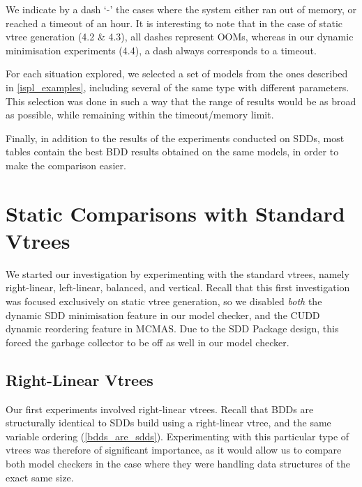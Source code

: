 \documentclass[11pt]{report}
\begin{document}
We indicate by a dash `-' the cases where the system either ran out of memory, or reached a timeout of an hour. It is interesting to note that in the case of static vtree generation (4.2 \& 4.3), all dashes represent OOMs, whereas in our dynamic minimisation experiments (4.4), a dash always corresponds to a timeout.

For each situation explored, we selected a set of models from the ones described in \ref{ispl_examples}, including several of the same type with different parameters. This selection was done in such a way that the range of results would be as broad as possible, while remaining within the timeout/memory limit. 

Finally, in addition to the results of the experiments conducted on SDDs, most tables contain the best BDD results obtained on the same models, in order to make the comparison easier.

\section{Static Comparisons with Standard Vtrees}

We started our investigation by experimenting with the standard vtrees, namely right-linear, left-linear, balanced, and vertical. Recall that this first investigation was focused exclusively on static vtree generation, so we disabled \textit{both }the dynamic SDD minimisation feature in our model checker, and the CUDD dynamic reordering feature in MCMAS. Due to the SDD Package design, this forced the garbage collector to be off as well in our model checker.

\subsection{Right-Linear Vtrees} 

Our first experiments involved right-linear vtrees. Recall that BDDs are structurally identical to SDDs build using a right-linear vtree, and the same variable ordering (\ref{bdds_are_sdds}). Experimenting with this particular type of vtrees was therefore of significant importance, as it would allow us to compare both model checkers in the case where they were handling data structures of the exact same size.
\end{document}
